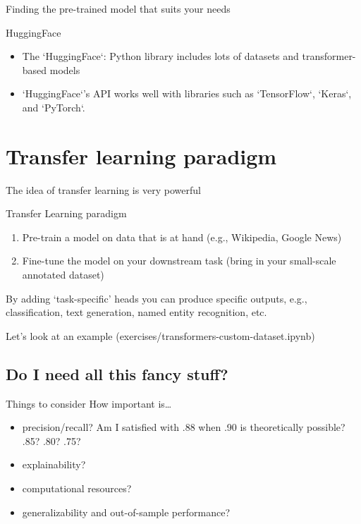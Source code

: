 \documentclass[compress]{beamer}
\begin{document}
\begin{frame}{Finding the pre-trained model that suits your needs}
	\begin{block}{HuggingFace}
		\begin{itemize}[<+->]
			\item The `HuggingFace`: Python library includes lots of datasets and transformer-based models 
			\item `HuggingFace`'s API works well with libraries such as `TensorFlow`, `Keras`, and `PyTorch`. 
		\end{itemize}
	\end{block}
\end{frame}

\section{Transfer learning paradigm}

\begin{frame}{The idea of transfer learning is very powerful}
	\begin{block}{Transfer Learning paradigm}
		\begin{enumerate}
			\item \alert{Pre-train} a model on data that is at hand (e.g., Wikipedia, Google News)
			\item \alert{Fine-tune} the model on your downstream task (bring in your small-scale annotated dataset)
		\end{enumerate}
	By adding `task-specific' heads you can produce specific outputs, e.g., classification, text generation, named entity recognition, etc. 
	\end{block}
\end{frame}

\begin{frame}[standout]
	Let's look at an example (exercises/transformers-custom-dataset.ipynb)
\end{frame}

\subsection{Do I need all this fancy stuff?}

\begin{frame}{Things to consider}
	How important is\ldots
	\begin{itemize}[<+->]
		\item precision/recall? Am I satisfied with .88 when .90 is theoretically possible? .85? .80? .75?
		\item explainability?
		\item computational resources?
		\item generalizability and out-of-sample performance?
	\end{itemize}
\end{frame}
\end{document}
